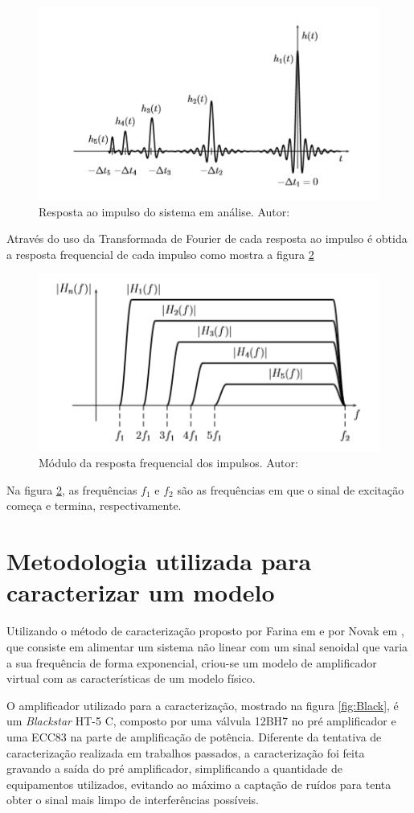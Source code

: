 \begin{figure}
	\centering
	\includegraphics[width=0.6\linewidth]{figuras/NLCIR}
	\caption{Resposta ao impulso do sistema em análise. Autor: \cite{novakdissertation}}
	\label{fig:nlcir}
\end{figure}

Através do uso da Transformada de Fourier de cada resposta ao impulso é obtida a resposta frequencial de cada impulso como mostra a figura \ref{fig:nlcfr}
\begin{figure}
	\centering
	\includegraphics[width=0.6\linewidth]{figuras/NLCFR}
	\caption{Módulo da resposta frequencial dos impulsos. Autor:\cite{novakdissertation}}
	\label{fig:nlcfr}
\end{figure}

Na figura \ref{fig:nlcfr}, as frequências $f_{1}$ e $f_{2}$ são as frequências em que o sinal de excitação começa e termina, respectivamente.

\section{Metodologia utilizada para caracterizar um modelo}\label{Metodologia}

Utilizando o método de caracterização proposto por Farina em \cite{farina2001non} e por Novak em \cite{novak2010nonlinear}, que consiste em alimentar um sistema não linear com um sinal senoidal que varia a sua frequência de forma exponencial, criou-se um modelo de amplificador virtual com as características de um modelo físico.

O amplificador utilizado para a caracterização, mostrado na figura \ref{fig:Black}, é um \textit{Blackstar} HT-5 C, composto por uma válvula 12BH7 no pré amplificador e uma ECC83 na parte de amplificação de potência. Diferente da tentativa de caracterização realizada em trabalhos passados, a caracterização foi feita gravando a saída do pré amplificador, simplificando a quantidade de equipamentos utilizados, evitando ao máximo a captação de ruídos para tenta obter o sinal mais limpo de interferências possíveis.


